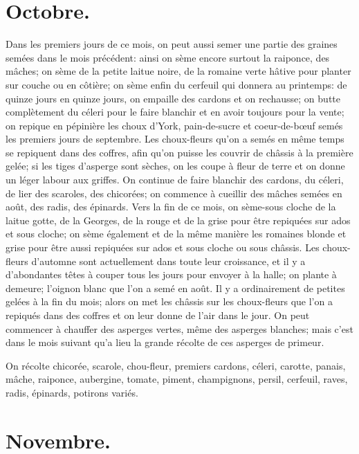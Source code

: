 \documentclass[10pt,a4paper]{book}
\begin{document}
\section{Octobre.}

Dans les premiers jours de ce mois, on peut aussi semer une partie des graines semées dans le mois précédent: ainsi on sème encore surtout la raiponce, des mâches; on sème de la petite laitue noire, de la romaine verte hâtive pour planter sur couche ou en côtière; on sème enfin du cerfeuil qui donnera au printemps: de quinze jours en quinze jours, on empaille des cardons et on rechausse; on butte complètement du céleri pour le faire blanchir et en avoir toujours pour la vente; on repique en pépinière les choux d'York, pain-de-sucre et coeur-de-bœuf semés les premiers jours de septembre. Les choux-fleurs qu'on a semés en même temps se repiquent dans des coffres, afin qu'on puisse les couvrir de châssis à la première gelée; si les tiges d'asperge sont sèches, on les coupe à fleur de terre et on donne un léger labour aux griffes. On continue de faire blanchir des cardons, du céleri, de lier des scaroles, des chicorées; on commence à cueillir des mâches semées en août, des radis, des épinards. Vers la fin de ce mois, on sème-sous cloche de la laitue gotte, de la Georges, de la rouge et de la grise pour être repiquées sur ados et sous cloche; on sème également et de la même manière les romaines blonde et grise pour être aussi repiquées sur ados et sous cloche ou sous châssis. Les choux-fleurs d'automne sont actuellement dans toute leur croissance, et il y a d'abondantes têtes à couper tous les jours pour envoyer à la halle; on plante à demeure; l'oignon blanc que l'on a semé en août. Il y a ordinairement de petites gelées à la fin du mois; alors on met les châssis sur les choux-fleurs que l'on a repiqués dans des coffres et on leur donne de l'air dans le jour. On peut commencer à chauffer des asperges vertes, même des asperges blanches; mais c'est dans le mois suivant qu'a lieu la grande récolte de ces asperges de primeur.

On récolte chicorée, scarole, chou-fleur, premiers cardons, céleri, carotte, panais, mâche, raiponce, aubergine, tomate, piment, champignons, persil, cerfeuil, raves, radis, épinards, potirons variés.

\section{Novembre.}
\end{document}
